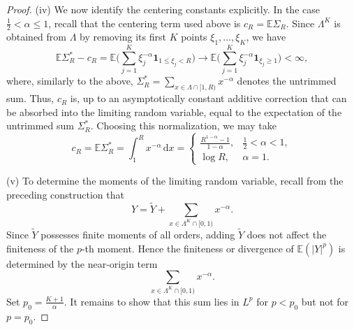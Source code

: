 \documentclass[11pt,twoside,a4paper,reqno]{amsart}
\renewcommand{\d}{\, \text{d}}
\newcommand{\E}{\mathbb{E}}
\begin{document}
\begin{proof}
(iv) We now identify the centering constants explicitly. In the case  $\frac12<\alpha\le1$, recall that the centering term used above is $c_R=\mathbb E\Sigma_R$. Since $\Lambda^K$ is obtained from $\Lambda$ by removing its first $K$ points $\xi_1,\ldots,\xi_K$, we have
$$\mathbb E\Sigma_R^*-c_R=\mathbb E\biggl(\sum_{j=1}^K\xi_j^{-\alpha}\mathbf 1_{{1\le\xi_j<R}}\biggr)
\to\mathbb E\biggl(\sum_{j=1}^K\xi_j^{-\alpha}
\mathbf 1_{{\xi_j\ge1}}\biggr)<\infty,
$$
where, similarly to the above, $\Sigma_R^*=\sum_{x\in \Lambda \cap[1,R)} x^{-\alpha}$ denotes the untrimmed sum.
Thus, $c_R$ is, up to an asymptotically constant additive correction that can be absorbed into the limiting random variable, equal to the expectation of the untrimmed sum $\Sigma_R^*$. Choosing this normalization, we may take
$$
c_R=\mathbb E\Sigma_R^*
=\int_1^R x^{-\alpha}\d x
=
\begin{cases}
\displaystyle\frac{R^{1-\alpha}-1}{1-\alpha},
& \frac12<\alpha<1,\\[1.2ex]
\log R,
& \alpha=1.
\end{cases}$$


(v)
To determine the moments of the limiting random variable, recall from the
preceding construction that
\begin{equation*}
Y=\tilde Y+\sum_{x\in\Lambda^K\cap[0,1)}x^{-\alpha}.
\end{equation*}
Since $\tilde Y$ possesses finite moments of all orders, adding $\tilde Y$ does not affect the finiteness of the $p$-th moment. Hence the finiteness or divergence of $\E(|Y|^p)$ is determined by the near-origin term
\begin{equation*}
\sum_{x\in\Lambda^K\cap[0,1)}x^{-\alpha}.
\end{equation*}
Set $p_0 = \frac{K+1}{\alpha}$. It remains to show that this sum lies in $L^p$ for $p<p_0$ but not for $p=p_0$.




\end{proof}
\end{document}
